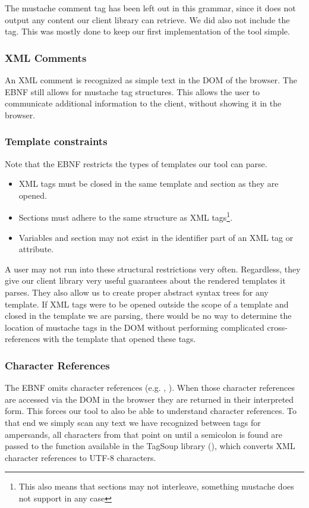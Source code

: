 \documentclass[thesis.tex]{subfiles}
\begin{document}
The mustache comment tag has been left out in this grammar, since it does not
output any content our client library can retrieve. We did also not include the
 tag. This was mostly done to keep our first
implementation of the tool simple.

\subsubsection{XML Comments}
An XML comment is recognized as simple text in the DOM of the browser. The EBNF
still allows for mustache tag structures. This allows the user to communicate
additional information to the client, without showing it in the browser.

\subsubsection{Template constraints}
Note that the EBNF restricts the types of
templates our tool can parse.

\begin{itemize}
\item XML tags must be closed in the same template and section as they are opened.
\item Sections must adhere to the same structure as XML tags\footnote{
      This also means that sections may not interleave, something mustache
      does not support in any case}.
\item Variables and section may not exist in the identifier part of an XML tag
      or attribute.
\end{itemize}

A user may not run into these structural restrictions very often. Regardless,
they give our client library very useful guarantees about the rendered templates
it parses. They also allow us to create proper abstract syntax trees for any
template.
If XML tags were to be opened outside the scope of a template
and closed in the template we are parsing, there would be no way to determine
the location of mustache tags in the DOM without performing complicated
cross-references with the template that opened these tags.

\subsubsection{Character References}
The EBNF omits character references (e.g. , ).
When those character references are accessed via the DOM in the browser they are
returned in their interpreted form. This forces our tool to also be able to
understand character references. To that end we simply scan any text we have
recognized between tags for ampersands, all characters from that point on until
a semicolon is found are passed to the  function available
in the TagSoup library (), which converts
XML character references to UTF-8 characters.
\end{document}
